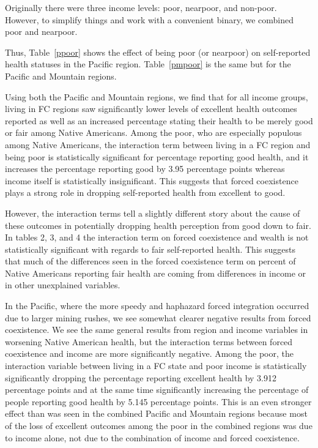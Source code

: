 \documentclass[12pt]{article}
\begin{document}
Originally there were three income levels: poor, nearpoor, and non-poor.
However, to simplify things and work with a convenient binary, we combined poor and nearpoor.

Thus, Table~\ref{ppoor} shows the effect of being poor (or nearpoor) on self-reported health statuses in the Pacific region.
Table~\ref{pmpoor} is the same but for the Pacific and Mountain regions.

Using both the Pacific and Mountain regions, we find that for all income groups, living in FC regions saw significantly lower levels of excellent health outcomes reported as well as an increased percentage stating their health to be merely good or fair among Native Americans.
Among the poor, who are especially populous among Native Americans, the interaction term between living in a FC region and being poor is statistically significant for percentage reporting good health, and it increases the percentage reporting good by 3.95 percentage points whereas income itself is statistically insignificant.
This suggests that forced coexistence plays a strong role in dropping self-reported health from excellent to good.

However, the interaction terms tell a slightly different story about the cause of these outcomes in potentially dropping health perception from good down to fair. 
In tables 2, 3, and 4 the interaction term on forced coexistence and wealth is not statistically significant with regards to fair self-reported health. 
This suggests that much of the differences seen in the forced coexistence term on percent of Native Americans reporting fair health are coming from differences in income or in other unexplained variables.  

In the Pacific, where the more speedy and haphazard forced integration occurred due to larger mining rushes, we see somewhat clearer negative results from forced coexistence. 
We see the same general results from region and income variables in worsening Native American health, but the interaction terms between forced coexistence and income are more significantly negative.  
Among the poor, the interaction variable between living in a FC state and poor income is statistically significantly dropping the percentage reporting excellent health by 3.912 percentage points and at the same time significantly increasing the percentage of people reporting good health by 5.145 percentage points.  
This is an even stronger effect than was seen in the combined Pacific and Mountain regions because most of the loss of excellent outcomes among the poor in the combined regions was due to income alone, not due to the combination of income and forced coexistence.
\end{document}
